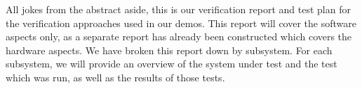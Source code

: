 All jokes from the abstract aside, this is our verification report and test plan for the
verification approaches used in our demos.
This report will cover the software aspects only, as a separate report has already been constructed
which covers the hardware aspects.
We have broken this report down by subsystem.
For each subsystem, we will provide an overview of the system under test and the test which was
run, as well as the results of those tests.